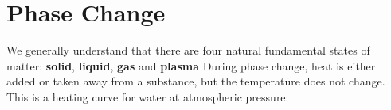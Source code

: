 \section{Phase Change}

We generally understand that there are four natural fundamental states of
matter: \textbf{solid}, \textbf{liquid}, \textbf{gas} and \textbf{plasma}
%
%
%
%
%  
%
%  
%
%
%
%
During phase change, heat is either added or taken away from a substance, but
the temperature does not change. This is a heating curve for water at
atmospheric pressure:
%
%
%
%
